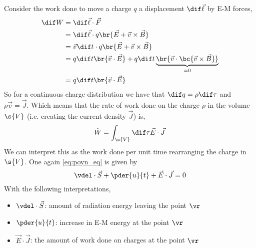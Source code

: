 \documentclass{article}
\begin{document}
Consider the work done to move a charge $q$ a displacement $\dif \vec{\ell}$ by E-M forces,
\begin{align*}
\dif W &= \dif \vec{\ell} \cdot \vec{F} \\
&= \dif \vec{\ell} \cdot q \br{\vec{E} + \vec{v} \times \vec{B}}\\
&= \vec{v} \dif t \cdot q \br{\vec{E} + \vec{v} \times \vec{B}}\\
&= q \dif t \br{\vec{v} \cdot \vec{E}} + q \dif t \underbrace{\br{\vec{v} \cdot \bc{\vec{v} \times \vec{B}}}}_{= 0} \\
&= q \dif t \br{\vec{v} \cdot \vec{E}}
\end{align*}
So for a continuous charge distribution we have that $\dif q = \rho \dif \tau$ and $\rho \vec{v} = \vec{J}$. Which means that the rate of work done on the charge $\rho$ in the volume $\s{V}$ (i.e. creating the current density $\vec{J}$) is,
\[ \dot{W} = \int_{\s{V}} \dif \tau \vec{E} \cdot \vec{J} \]
We can interpret this as the work done per unit time rearranging the charge in $\s{V}$. One again \cref{eq:poyn_eq} is given by
\[ \vdel \cdot \vec{S} + \pder{u}{t} + \vec{E} \cdot \vec{J} = 0 \]
With the following interpretations,
\begin{itemize}
    \item $\vdel \cdot \vec{S}$: amount of radiation energy leaving the point $\vr$
    \item $\pder{u}{t}$: increase in E-M energy at the point $\vr$
    \item $\vec{E} \cdot \vec{J}$: the amount of work done on charges at the point $\vr$
\end{itemize}

\end{document}

